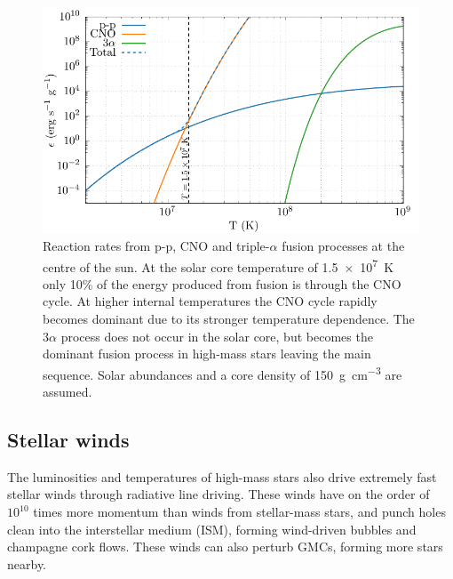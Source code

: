 \begin{figure}[h]
  \centering
  \includegraphics{assets/reaction-rate/reaction-solar.pdf}
  \caption[Reaction rates at the center of the sun]{Reaction rates from p-p, CNO and triple-$\alpha$ fusion processes at the centre of the sun. At the solar core temperature of \SI{1.5e7}{\kelvin} only 10\% of the energy produced from fusion is through the CNO cycle. At higher internal temperatures the CNO cycle rapidly becomes dominant due to its stronger temperature dependence. The $3\alpha$ process does not occur in the solar core, but becomes the dominant fusion process in high-mass stars leaving the main sequence. Solar abundances and a core density of \SI{150}{\gram\per\centi\metre\cubed} are assumed.}
\end{figure}


\subsection{Stellar winds}

The luminosities and temperatures of high-mass stars also drive extremely fast stellar winds through radiative line driving.
These winds have on the order of $10^{10}$ times more momentum than winds from stellar-mass stars, and punch holes clean into the interstellar medium (ISM), forming wind-driven bubbles and champagne cork flows.
These winds can also perturb GMCs, forming more stars nearby.


